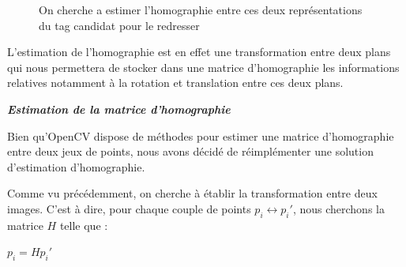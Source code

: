         \begin{figure}[h]
            \centering
            \hspace{.02\textwidth}
            \caption{On cherche a estimer l'homographie entre ces deux représentations du tag candidat pour le redresser}
        \end{figure}

        L'estimation de l'homographie est en effet une transformation entre deux plans qui nous permettera de stocker dans une matrice d'homographie les informations relatives notamment à la rotation et translation entre ces deux plans.

        \textbf{\textit{Estimation de la matrice d'homographie}}

        Bien qu'OpenCV dispose de méthodes pour estimer une matrice d'homographie entre deux jeux de points, nous avons décidé de réimplémenter une solution d'estimation d'homographie.

        Comme vu précédemment, on cherche à établir la transformation entre deux images. C'est à dire, pour chaque couple de points $p_i \leftrightarrow p_{i}' $, nous cherchons la matrice $H$ telle que :
    
        \begin{center}
            $ p_i = Hp_i' $            
        \end{center}

